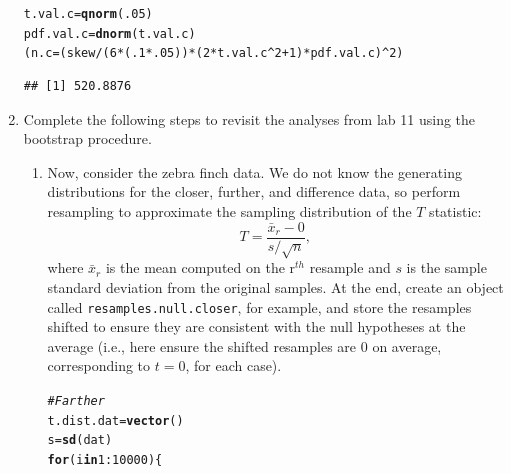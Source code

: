 \documentclass{article}\usepackage[]{graphicx}\usepackage[]{xcolor}
\makeatletter
\newcommand{\hlnum}[1]{\textcolor[rgb]{0.686,0.059,0.569}{#1}}%
\newcommand{\hlcom}[1]{\textcolor[rgb]{0.678,0.584,0.686}{\textit{#1}}}%
\newcommand{\hlopt}[1]{\textcolor[rgb]{0,0,0}{#1}}%
\newcommand{\hldef}[1]{\textcolor[rgb]{0.345,0.345,0.345}{#1}}%
\newcommand{\hlkwa}[1]{\textcolor[rgb]{0.161,0.373,0.58}{\textbf{#1}}}%
\newcommand{\hlkwb}[1]{\textcolor[rgb]{0.69,0.353,0.396}{#1}}%
\newcommand{\hlkwd}[1]{\textcolor[rgb]{0.737,0.353,0.396}{\textbf{#1}}}%
\newenvironment{kframe}{%
 \def\at@end@of@kframe{}%
 \ifinner\ifhmode%
  \def\at@end@of@kframe{\end{minipage}}%
  \begin{minipage}{\columnwidth}%
 \fi\fi%
 \def\FrameCommand##1{\hskip\@totalleftmargin \hskip-\fboxsep
 \colorbox{shadecolor}{##1}\hskip-\fboxsep
     \hskip-\linewidth \hskip-\@totalleftmargin \hskip\columnwidth}%
 \MakeFramed {\advance\hsize-\width
   \@totalleftmargin\z@ \linewidth\hsize
   \@setminipage}}%
 {\par\unskip\endMakeFramed%
 \at@end@of@kframe}
\newenvironment{knitrout}{}{} %
\makeatother
\begin{document}
\begin{enumerate}
\begin{knitrout}\scriptsize
{}\color{fgcolor}\begin{kframe}
\begin{alltt}
\hldef{t.val.c} \hlkwb{=} \hlkwd{qnorm}\hldef{(}\hlnum{.05}\hldef{)}
\hldef{pdf.val.c} \hlkwb{=} \hlkwd{dnorm}\hldef{(t.val.c)}
\hldef{(n.c} \hlkwb{=} \hldef{(skew}\hlopt{/}\hldef{(}\hlnum{6}\hlopt{*}\hldef{(}\hlnum{.1}\hlopt{*}\hlnum{.05}\hldef{))}\hlopt{*}\hldef{(}\hlnum{2}\hlopt{*}\hldef{t.val.c}\hlopt{^}\hlnum{2}\hlopt{+}\hlnum{1}\hldef{)}\hlopt{*}\hldef{pdf.val.c)}\hlopt{^}\hlnum{2}\hldef{)}
\end{alltt}
\begin{verbatim}
## [1] 520.8876
\end{verbatim}
\end{kframe}
\end{knitrout}
\item Complete the following steps to revisit the analyses from lab 11 using the
bootstrap procedure.
\begin{enumerate}
\item Now, consider the zebra finch data. We do not know the generating distributions
for the closer, further, and difference data, so perform resampling to approximate the 
sampling distribution of the $T$ statistic:
  \[T = \frac{\bar{x}_r - 0}{s/\sqrt{n}},\]
  where $\bar{x}_r$ is the mean computed on the r$^{th}$ resample and $s$ is the
  sample standard deviation from the original samples. At the end, create an
  object called \texttt{resamples.null.closer}, for example, and store the 
  resamples shifted to ensure they are consistent with the null hypotheses at the average 
  (i.e., here ensure the shifted resamples are 0 on average, corresponding
  to $t=0$, for each case). 
\begin{knitrout}\scriptsize
{}\color{fgcolor}\begin{kframe}
\begin{alltt}
\hlcom{#Farther}
\hldef{t.dist.dat} \hlkwb{=} \hlkwd{vector}\hldef{()}
\hldef{s} \hlkwb{=} \hlkwd{sd}\hldef{(dat)}
\hlkwa{for}\hldef{(i} \hlkwa{in} \hlnum{1}\hlopt{:}\hlnum{10000}\hldef{)\{}

\end{alltt}
\end{kframe}
\end{knitrout}
\end{enumerate}
\end{enumerate}
\end{document}
